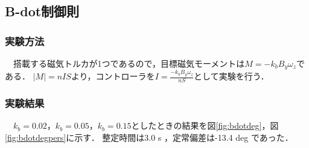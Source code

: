\subsection{B-dot制御則}
\subsubsection{実験方法}
　搭載する磁気トルカが1つであるので，目標磁気モーメントは$M=-k_bB_y\omega_z$である．
$|M|=nIS$より，コントローラを$I=\frac{-k_bB_y\omega_z}{nS}$として実験を行う．

\subsubsection{実験結果}
　$k_b=0.02，k_b=0.05，k_b=0.15$としたときの結果を図\ref{fig:bdotdeg}，図\ref{fig:bdotdegpers}に示す．
整定時間は3.0 s ，定常偏差は-13.4 deg であった．

